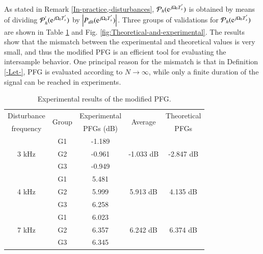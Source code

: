 \documentclass [11pt, proquest] {uwthesis}[2020/02/24]
\begin{document}
As stated in Remark \ref{In-practice,-disturbances}, $\mathcal{P}_{h}(\mathrm{e}^{j\Omega_{0}T_{s}^{'}})$
is obtained by means of dividing $\mathcal{P}_{h}^{'}(\mathrm{e}^{j\Omega_{0}T_{s}^{'}})$
by $\left|P_{dh}(\mathrm{e}^{j\Omega_{0}T_{s}^{'}})\right|$. Three groups
of validations for $\mathcal{P}_{h}(\mathrm{e}^{j\Omega_{0}T_{s}^{'}})$ are
shown in Table \ref{tab:Experimental-results-of-10} and Fig. \ref{fig:Theoretical-and-experimental}.
The results show that the mismatch between the experimental and theoretical
values is very small, and thus the modified PFG is an efficient tool
for evaluating the intersample behavior. One principal reason for
the mismatch is that in Definition \ref{-Let-}, PFG is evaluated
according to $N\rightarrow\infty$, while only a finite duration of
the signal can be reached in experiments.
\begin{table}[!ht]
\caption{\label{tab:Experimental-results-of-10}Experimental results of the modified
PFG.}
\begin{centering}
\begin{tabular}{@{} ccccc @{}} 
\toprule
Disturbance & \multirow{2}{*}{Group} & Experimental & \multirow{2}{*}{Average} & Theoretical \\
frequency & & PFGs (dB) & & PFGs\\
\midrule
\multirow{3}{*}{3 kHz} & G1 & -1.189 & \multirow{3}{*}{-1.033 dB} & \multirow{3}{*}{-2.847 dB} \\
& G2 & -0.961 &  & \\
& G3 & -0.949 &  & \\
\midrule
\multirow{3}{*}{4 kHz} & G1 & 5.481 & \multirow{3}{*}{5.913 dB} & \multirow{3}{*}{4.135 dB} \\
& G2 & 5.999 &  & \\
& G3 & 6.258 &  & \\
\midrule
\multirow{3}{*}{7 kHz} & G1 & 6.023 & \multirow{3}{*}{6.242 dB} & \multirow{3}{*}{6.374 dB} \\
& G2 & 6.357 &  & \\
& G3 & 6.345 &  & \\
\bottomrule
\end{tabular}
\par\end{centering}
\end{table}
\end{document}
